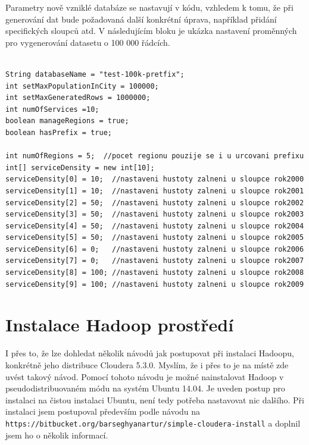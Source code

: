\documentclass[thesis=M,czech]{FITthesis}[2012/06/26]
\begin{document}
Parametry nově vzniklé databáze se nastavují v kódu, vzhledem k tomu, že při generování dat bude požadovaná další konkrétní úprava, například přidání specifických sloupců atd. V následujícím bloku je ukázka nastavení proměnných pro vygenerování datasetu o 100 000 řádcích. \pagebreak

\begin{lstlisting}[frame=single]  % Start your code-block

String databaseName = "test-100k-pretfix";
int setMaxPopulationInCity = 100000;
int setMaxGeneratedRows = 1000000;
int numOfServices =10; 
boolean manageRegions = true;
boolean hasPrefix = true;
        
int numOfRegions = 5;  //pocet regionu pouzije se i u urcovani prefixu
int[] serviceDensity = new int[10];
serviceDensity[0] = 10;  //nastaveni hustoty zalneni u sloupce rok2000
serviceDensity[1] = 10;  //nastaveni hustoty zalneni u sloupce rok2001
serviceDensity[2] = 50;  //nastaveni hustoty zalneni u sloupce rok2002
serviceDensity[3] = 50;  //nastaveni hustoty zalneni u sloupce rok2003
serviceDensity[4] = 50;  //nastaveni hustoty zalneni u sloupce rok2004
serviceDensity[5] = 50;  //nastaveni hustoty zalneni u sloupce rok2005
serviceDensity[6] = 0;   //nastaveni hustoty zalneni u sloupce rok2006
serviceDensity[7] = 0;   //nastaveni hustoty zalneni u sloupce rok2007
serviceDensity[8] = 100; //nastaveni hustoty zalneni u sloupce rok2008
serviceDensity[9] = 100; //nastaveni hustoty zalneni u sloupce rok2009
\end{lstlisting}        


\chapter{Instalace Hadoop prostředí}
I přes to, že lze dohledat několik návodů jak postupovat při instalaci Hadoopu, konkrétně jeho distribuce Cloudera 5.3.0. Myslím, že i přes to je na místě zde uvést takový návod. Pomocí tohoto návodu je možné nainstalovat Hadoop v pseudodistribuovaném módu na systém Ubuntu 14.04. Je uveden postup pro instalaci na čistou instalaci Ubuntu, není tedy potřeba nastavovat nic dalšího. Při instalaci jsem postupoval především podle návodu na  \texttt{https://bitbucket.org/barseghyanartur/simple-cloudera-install} a doplnil jsem ho o několik informací.
\end{document}
